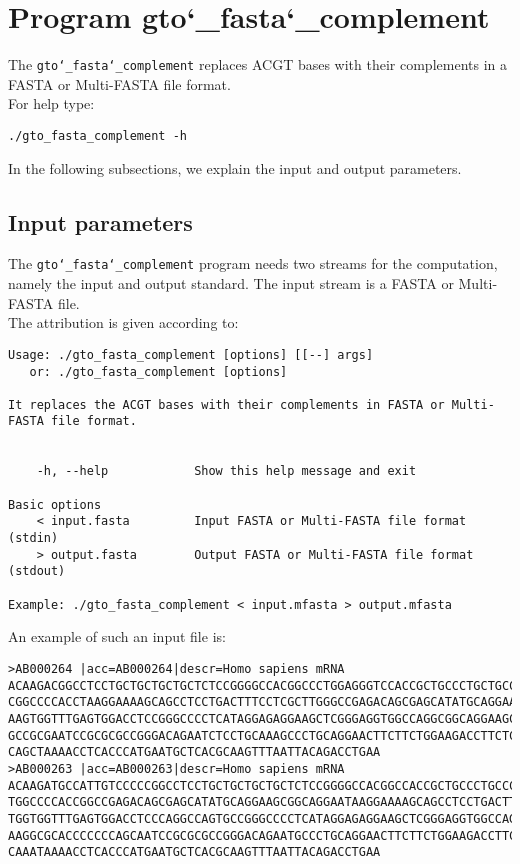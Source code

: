 \section{Program gto\char`_fasta\char`_complement}
The \texttt{gto\char`_fasta\char`_complement} replaces ACGT bases with their complements in a FASTA or Multi-FASTA file format.\\
For help type:
\begin{lstlisting}
./gto_fasta_complement -h
\end{lstlisting}
In the following subsections, we explain the input and output parameters.

\subsection*{Input parameters}

The \texttt{gto\char`_fasta\char`_complement} program needs two streams for the computation, namely the input and output standard. The input stream is a FASTA or Multi-FASTA file.\\
The attribution is given according to:
\begin{lstlisting}
Usage: ./gto_fasta_complement [options] [[--] args]
   or: ./gto_fasta_complement [options]

It replaces the ACGT bases with their complements in FASTA or Multi-FASTA file format.


    -h, --help            Show this help message and exit

Basic options
    < input.fasta         Input FASTA or Multi-FASTA file format (stdin)
    > output.fasta        Output FASTA or Multi-FASTA file format (stdout)

Example: ./gto_fasta_complement < input.mfasta > output.mfasta
\end{lstlisting}
An example of such an input file is:
\begin{lstlisting}
>AB000264 |acc=AB000264|descr=Homo sapiens mRNA 
ACAAGACGGCCTCCTGCTGCTGCTGCTCTCCGGGGCCACGGCCCTGGAGGGTCCACCGCTGCCCTGCTGCCATTGTCCC
CGGCCCCACCTAAGGAAAAGCAGCCTCCTGACTTTCCTCGCTTGGGCCGAGACAGCGAGCATATGCAGGAAGCGGCAGG
AAGTGGTTTGAGTGGACCTCCGGGCCCCTCATAGGAGAGGAAGCTCGGGAGGTGGCCAGGCGGCAGGAAGCAGGCCAGT
GCCGCGAATCCGCGCGCCGGGACAGAATCTCCTGCAAAGCCCTGCAGGAACTTCTTCTGGAAGACCTTCTCCACCCCCC
CAGCTAAAACCTCACCCATGAATGCTCACGCAAGTTTAATTACAGACCTGAA
>AB000263 |acc=AB000263|descr=Homo sapiens mRNA 
ACAAGATGCCATTGTCCCCCGGCCTCCTGCTGCTGCTGCTCTCCGGGGCCACGGCCACCGCTGCCCTGCCCCTGGAGGG
TGGCCCCACCGGCCGAGACAGCGAGCATATGCAGGAAGCGGCAGGAATAAGGAAAAGCAGCCTCCTGACTTTCCTCGCT
TGGTGGTTTGAGTGGACCTCCCAGGCCAGTGCCGGGCCCCTCATAGGAGAGGAAGCTCGGGAGGTGGCCAGGCGGCAGG
AAGGCGCACCCCCCCAGCAATCCGCGCGCCGGGACAGAATGCCCTGCAGGAACTTCTTCTGGAAGACCTTCTCCTCCTG
CAAATAAAACCTCACCCATGAATGCTCACGCAAGTTTAATTACAGACCTGAA
\end{lstlisting}

